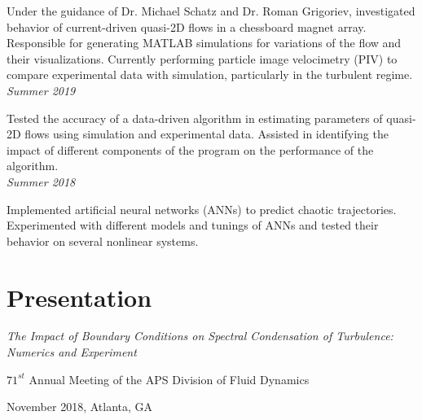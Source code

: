 \documentclass{article}
\begin{document}
Under the guidance of Dr. Michael Schatz and Dr. Roman Grigoriev, investigated behavior of current-driven quasi-2D flows in a chessboard magnet array. Responsible for generating MATLAB simulations for variations of the flow and their visualizations. Currently performing particle image velocimetry (PIV) to compare experimental data with simulation, particularly in the turbulent regime. \\

\noindent
\textit{Summer 2019}

Tested the accuracy of a data-driven algorithm in estimating parameters of quasi-2D flows using simulation and experimental data. Assisted in identifying the impact of different components of the program on the performance of the algorithm. \\

\noindent
\textit{Summer 2018}

Implemented artificial neural networks (ANNs) to predict chaotic trajectories. Experimented with different models and tunings of ANNs and tested their behavior on several nonlinear systems.



\section{Presentation}
\textit{The Impact of Boundary Conditions on Spectral Condensation of Turbulence: Numerics and Experiment}

$71^{st}$ Annual Meeting of the APS Division of Fluid Dynamics

November 2018,
Atlanta, GA
\end{document}
